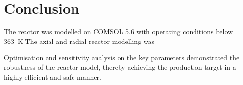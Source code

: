 \section{Conclusion} \label{sec:conclusion}
The reactor was modelled on COMSOL 5.6 with operating conditions below \SI{363}{\K} 
The axial and radial reactor modelling was 

Optimisation and sensitivity analysis on the key parameters demonstrated the robustness of the reactor model, thereby achieving the production target in a highly efficient and safe manner. 